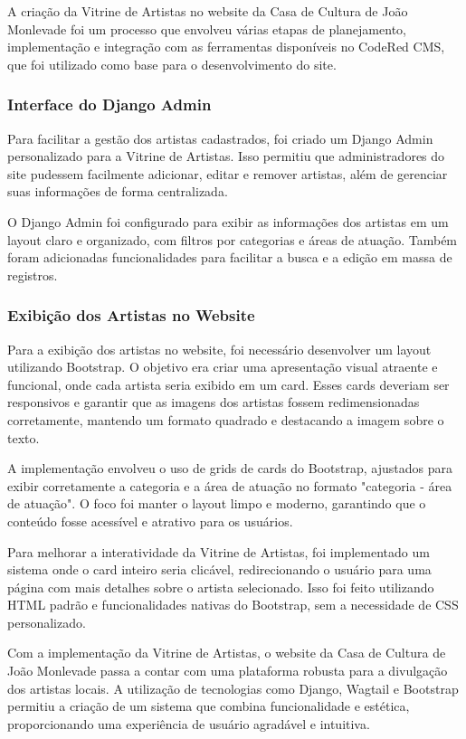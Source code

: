 A criação da Vitrine de Artistas no website da Casa de Cultura de João Monlevade foi um processo que envolveu várias etapas de planejamento, implementação e integração com as ferramentas disponíveis no CodeRed CMS, que foi utilizado como base para o desenvolvimento do site.



\subsubsection{Interface do Django Admin}

Para facilitar a gestão dos artistas cadastrados, foi criado um Django Admin personalizado para a Vitrine de Artistas. Isso permitiu que administradores do site pudessem facilmente adicionar, editar e remover artistas, além de gerenciar suas informações de forma centralizada.

O Django Admin foi configurado para exibir as informações dos artistas em um layout claro e organizado, com filtros por categorias e áreas de atuação. Também foram adicionadas funcionalidades para facilitar a busca e a edição em massa de registros.

\subsubsection{Exibição dos Artistas no Website}

Para a exibição dos artistas no website, foi necessário desenvolver um layout utilizando Bootstrap. O objetivo era criar uma apresentação visual atraente e funcional, onde cada artista seria exibido em um card. Esses cards deveriam ser responsivos e garantir que as imagens dos artistas fossem redimensionadas corretamente, mantendo um formato quadrado e destacando a imagem sobre o texto.

A implementação envolveu o uso de grids de cards do Bootstrap, ajustados para exibir corretamente a categoria e a área de atuação no formato "categoria - área de atuação". O foco foi manter o layout limpo e moderno, garantindo que o conteúdo fosse acessível e atrativo para os usuários.

Para melhorar a interatividade da Vitrine de Artistas, foi implementado um sistema onde o card inteiro seria clicável, redirecionando o usuário para uma página com mais detalhes sobre o artista selecionado. Isso foi feito utilizando HTML padrão e funcionalidades nativas do Bootstrap, sem a necessidade de CSS personalizado.

Com a implementação da Vitrine de Artistas, o website da Casa de Cultura de João Monlevade passa a contar com uma plataforma robusta para a divulgação dos artistas locais. A utilização de tecnologias como Django, Wagtail e Bootstrap permitiu a criação de um sistema que combina funcionalidade e estética, proporcionando uma experiência de usuário agradável e intuitiva.


